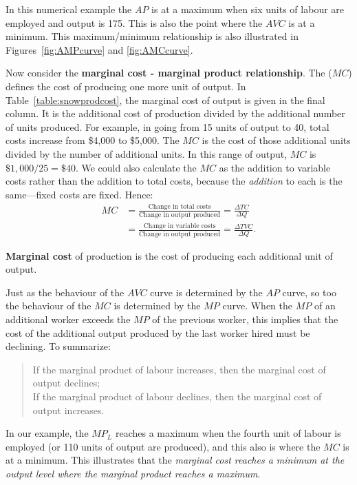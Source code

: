 

\newhtmlpage

In this numerical example the $AP$ is at a maximum when six units of labour
are employed and output is 175. This is also the point where the $AVC$ is at
a minimum. This maximum/minimum relationship is also illustrated in
Figures~\ref{fig:AMPcurve} and \ref{fig:AMCcurve}.

Now consider the \textbf{marginal cost - marginal product relationship}. The 
 ($MC$) defines the cost of producing one more
unit of output. In Table~\ref{table:snowprodcost}, the marginal cost of
output is given in the final column. It is the additional cost of production
divided by the additional number of units produced. For example, in going
from 15 units of output to 40, total costs increase from \$4,000 to \$5,000.
The $MC$ is the cost of those additional units divided by the number of
additional units. In this range of output, $MC$ is $\$1,000/25=\$40$. We could
also calculate the $MC$ as the addition to variable costs rather than the
addition to total costs, because the \textit{addition} to each is the
same---fixed costs are fixed. Hence:
\begin{align*}
	MC &=\frac{\text{Change in total costs}}{\text{Change in output produced}}=\frac{\Delta TC}{\Delta Q} \\
	&=\frac{\text{Change in variable costs}}{\text{Change in output produced}}=\frac{\Delta TVC}{\Delta Q}.
\end{align*}

\begin{DefBox}
	\textbf{Marginal cost} of production is the cost of producing each additional unit of output.
\end{DefBox}

Just as the behaviour of the $AVC$ curve is determined by the $AP$ curve, so
too the behaviour of the $MC$ is determined by the $MP$ curve. When the $MP$
of an additional worker exceeds the $MP$ of the previous worker, this
implies that the cost of the additional output produced by the last worker
hired must be declining. To summarize:
\begin{quote}
	If the marginal product of labour increases, then the marginal cost of output declines; \\
	If the marginal product of labour declines, then the marginal cost of output increases.
\end{quote}

In our example, the $MP_{L}$ reaches a maximum when the fourth unit of
labour is employed (or 110 units of output are produced), and this also is
where the $MC$ is at a minimum. This illustrates that the \textit{marginal 
cost reaches a minimum at the output level where the marginal product 
reaches a maximum}.

